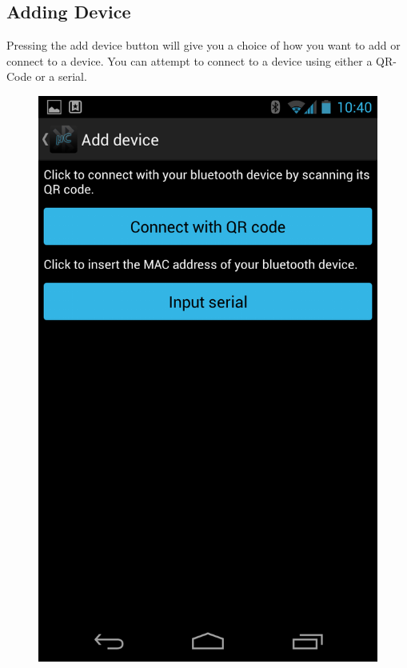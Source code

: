 \subsection{Adding Device}
Pressing the add device button will give you a choice of how you want to add or connect to a device. You can attempt to connect to a device using either a QR-Code or a serial.
\newline
\begin{figure}[H]
	\centering
	\includegraphics[scale = 0.3]{images/Screenshots/add_device.png}
\end{figure}

